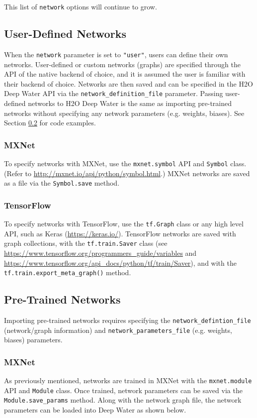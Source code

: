 		This list of \texttt{network} options will continue to grow.
		
		\subsection{User-Defined Networks}
			When the \texttt{network} parameter is set to \texttt{"user"}, users can define their own networks.  User-defined or custom networks (graphs) are specified through the API of the native backend of choice, and it is assumed the user is familiar with their backend of choice.  Networks are then saved and can be specified in the H2O Deep Water API via the \texttt{network\_definition\_file} parameter.  Passing user-defined networks to H2O Deep Water is the same as importing pre-trained networks without specifying any network parameters (e.g. weights, biases).  See Section \ref{sec:pre-trained-networks} for code examples.
			\subsubsection{MXNet}\label{sec:mx-network}
				To specify networks with MXNet, use the \texttt{mxnet.symbol} API and \texttt{Symbol} class. (Refer to {\url{http://mxnet.io/api/python/symbol.html}}.)  MXNet networks are saved as a file via the \texttt{Symbol.save} method.
				
			\subsubsection{TensorFlow}\label{sec:tf-network}
				To specify networks with TensorFlow, use the \texttt{tf.Graph} class or any high level API, such as Keras ({\url{https://keras.io/}}).  TensorFlow networks are saved with graph collections, with the \texttt{tf.train.Saver} class (see {\url{https://www.tensorflow.org/programmers_guide/variables}} and {\url{https://www.tensorflow.org/api_docs/python/tf/train/Saver}}), and with the \texttt{tf.train.export\_meta\_graph()} method.
				
		\newpage
		\subsection{Pre-Trained Networks}\label{sec:pre-trained-networks}
			Importing pre-trained networks requires specifying the \texttt{network\_defintion\_file} (network/graph information) and \texttt{network\_parameters\_file} (e.g. weights, biases) parameters.
			
			\subsubsection{MXNet}
				As previously mentioned, networks are trained in MXNet with the \texttt{mxnet.module} API and \texttt{Module} class. Once trained, network parameters can be saved via the \texttt{Module.save\_params} method.  Along with the network graph file, the network parameters can be loaded into Deep Water as shown below.

